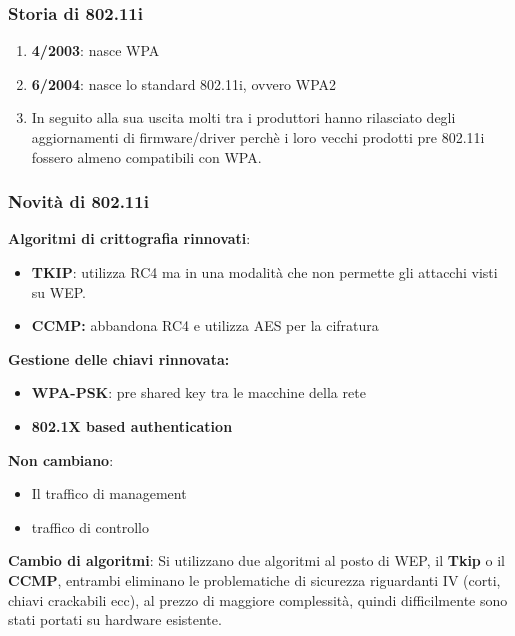 \documentclass[12pt]{article}
\begin{document}
			\subsubsection{Storia di 802.11i}
				\begin{enumerate}
					\item \textbf{4/2003}: nasce WPA
					\item \textbf{6/2004}: nasce lo standard 802.11i, ovvero WPA2
					\item In seguito alla sua uscita molti tra i produttori hanno rilasciato degli aggiornamenti di firmware/driver perchè i loro vecchi prodotti pre 802.11i fossero almeno compatibili con WPA.
				\end{enumerate}	
			\subsubsection{Novità di 802.11i}
			\textbf{Algoritmi di crittografia rinnovati}:
			\begin{itemize}
				\item  \textbf{TKIP}: utilizza RC4 ma in una modalità che non permette gli attacchi visti su WEP.
				\item \textbf{CCMP:} abbandona RC4 e utilizza AES per la cifratura 
			\end{itemize}
			\textbf{Gestione delle chiavi rinnovata:}
			\begin{itemize}
				\item \textbf{WPA-PSK}: pre shared key tra le macchine della rete
				\item \textbf{802.1X based authentication}	
			\end{itemize}
			\textbf{Non cambiano}:
			\begin{itemize}
				\item Il traffico di management
				\item traffico di controllo 
			\end{itemize}
			\textbf{Cambio di algoritmi}: Si utilizzano due algoritmi al posto di WEP, il \textbf{Tkip} o il \textbf{CCMP}, entrambi eliminano le problematiche di sicurezza riguardanti IV (corti, chiavi crackabili ecc), al prezzo di maggiore complessità, quindi difficilmente sono stati portati su hardware esistente.
\end{document}
